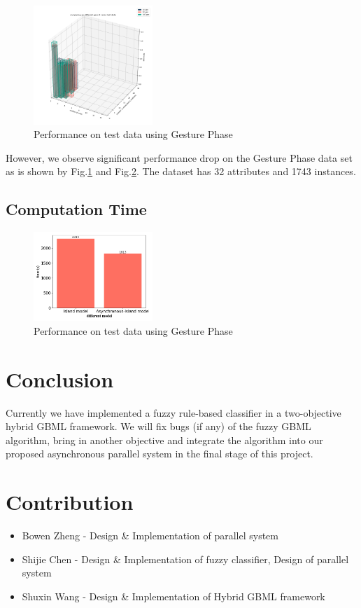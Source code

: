\documentclass[conference]{IEEEtran}
\begin{document}
  \begin{figure}[H]
    \centering
    \includegraphics[width=0.4\textwidth]{figures/diffGenTest.png}
    \caption{Performance on test data using Gesture Phase}\label{phTr}
  \end{figure}
  However, we observe significant performance drop on the Gesture Phase data set as is shown by Fig.\ref{phTr} and Fig.\ref{phT}. The dataset has 32 attributes and 1743 instances.
\subsection{Computation Time}
\begin{figure}[H]
  \centering
  \includegraphics[width=0.4\textwidth]{figures/diffModelTime.png}
  \caption{Performance on test data using Gesture Phase}\label{phT}
\end{figure}

 \section{Conclusion}
 Currently we have implemented a fuzzy rule-based classifier in a two-objective hybrid GBML framework. We will fix bugs (if any) of the fuzzy GBML algorithm, bring in another objective and integrate the algorithm into our proposed asynchronous parallel system in the final stage of this project. 

  \section{Contribution}
  
    \begin{itemize}
    \item Bowen Zheng - Design \& Implementation of parallel system
    \item Shijie Chen - Design \& Implementation of fuzzy classifier, Design of parallel system
    \item Shuxin Wang - Design \& Implementation of Hybrid GBML framework
    \end{itemize}



\end{document}
